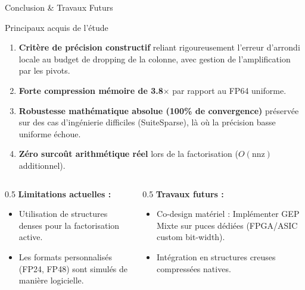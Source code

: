 \documentclass[10pt,aspectratio=169]{beamer}
\begin{document}
\begin{frame}{Conclusion \& Travaux Futurs}
    \begin{block}{Principaux acquis de l'étude}
        \begin{enumerate}
            \item \textbf{Critère de précision constructif} reliant rigoureusement l'erreur d'arrondi locale au budget de dropping de la colonne, avec gestion de l'amplification par les pivots.
            \item \textbf{Forte compression mémoire de 3.8$\times$} par rapport au FP64 uniforme.
            \item \textbf{Robustesse mathématique absolue (100\% de convergence)} préservée sur des cas d'ingénierie difficiles (SuiteSparse), là où la précision basse uniforme échoue.
            \item \textbf{Zéro surcoût arithmétique réel} lors de la factorisation ($O(\text{nnz})$ additionnel).
        \end{enumerate}
    \end{block}
    
    \vspace{0.3cm}
    \begin{columns}
        \begin{column}{0.5\textwidth}
            \textbf{Limitations actuelles :}
            \begin{itemize}
                \item Utilisation de structures denses pour la factorisation active.
                \item Les formats personnalisés (FP24, FP48) sont simulés de manière logicielle.
            \end{itemize}
        \end{column}
        
        \begin{column}{0.5\textwidth}
            \textbf{Travaux futurs :}
            \begin{itemize}
                \item Co-design matériel : Implémenter GEP Mixte sur puces dédiées (FPGA/ASIC custom bit-width).
                \item Intégration en structures creuses compressées natives.
            \end{itemize}
        \end{column}
    \end{columns}
\end{frame}
\end{document}
